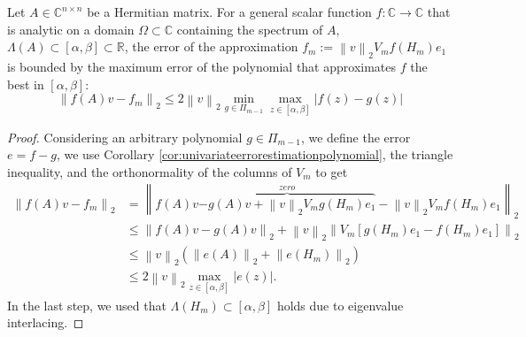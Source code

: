 \begin{theorem}
    \label{the:univariateerrorestimationgeneral}
    Let $A \in \mathbb{C}^{n \times n}$ be a Hermitian matrix. For a general scalar
    function $f: \mathbb{C} \to \mathbb{C}$ that is analytic on a domain
    $\Omega \subset \mathbb{C}$ containing the spectrum of $A$,
    $\Lambda(A) \subset [\alpha, \beta] \subset \mathbb{R}$, the error of the approximation
    $f_m := \left\| v \right\|_{2} V_m f(H_m) e_1$ is bounded by the maximum error
    of the polynomial that approximates $f$ the best in $[\alpha, \beta]$:
    \begin{equation}
        \label{eq:univariateerrorestimationgeneral}
        \left\| f(A)v - f_m \right\|_2 \le
        2 \left\| v \right\|_2 \min_{g \in \Pi_{m-1}}
        \max_{z \in [\alpha, \beta]} \left|f(z) - g(z) \right|
    \end{equation}
\end{theorem}
\begin{proof}
    Considering an arbitrary polynomial $g \in \Pi_{m-1}$, we define the error
    $e = f - g$, we use Corollary \ref{cor:univariateerrorestimationpolynomial},
    the triangle inequality, and the orthonormality of the columns of $V_m$ to get
    \begin{equation*}
        \begin{aligned}
            \left\| f(A)v - f_m \right\|_2
                & = \left\| f(A)v \overset{zero}{\overbrace{- g(A)v + \left\| v \right\|_{2} V_m g(H_m) e_1}}
                - \left\| v \right\|_{2} V_m f(H_m) e_1 \right\|_2 \\
            & \le \left\| f(A)v - g(A)v \right\|_{2}
                + \left\| v \right\|_{2}
                \left\| V_m [g(H_m) e_1 - f(H_m) e_1] \right\|_2\\
            & \le \left\| v \right\|_2 \left( \left\| e(A) \right\|_2 + \left\| e(H_m) \right\|_2 \right)\\
            & \le 2 \left\| v \right\|_2 \max_{z \in [\alpha, \beta]} \left| e(z) \right|.
            \end{aligned}
    \end{equation*}
    In the last step, we used that $\Lambda(H_m) \subset [\alpha, \beta]$
    holds due to eigenvalue interlacing.
\end{proof}

